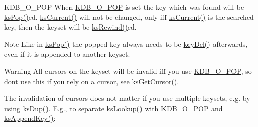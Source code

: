 \begin{DoxyParagraph}{K\+D\+B\+\_\+\+O\+\_\+\+P\+OP}
When \mbox{\hyperlink{group__keyset_gga98a3d6a4016c9dad9cbd1a99a9c2a45aa52fb5f2cc86773d393da62bebebf7984}{K\+D\+B\+\_\+\+O\+\_\+\+P\+OP}} is set the key which was found will be \mbox{\hyperlink{group__keyset_gae42530b04defb772059de0600159cf69}{ks\+Pop()}}ed. \mbox{\hyperlink{group__keyset_ga4287b9416912c5f2ab9c195cb74fb094}{ks\+Current()}} will not be changed, only iff \mbox{\hyperlink{group__keyset_ga4287b9416912c5f2ab9c195cb74fb094}{ks\+Current()}} is the searched key, then the keyset will be \mbox{\hyperlink{group__keyset_gabe793ff51f1728e3429c84a8a9086b70}{ks\+Rewind()}}ed.
\end{DoxyParagraph}
\begin{DoxyNote}{Note}
Like in \mbox{\hyperlink{group__keyset_gae42530b04defb772059de0600159cf69}{ks\+Pop()}} the popped key always needs to be \mbox{\hyperlink{group__key_ga3df95bbc2494e3e6703ece5639be5bb1}{key\+Del()}} afterwards, even if it is appended to another keyset.
\end{DoxyNote}
\begin{DoxyWarning}{Warning}
All cursors on the keyset will be invalid iff you use \mbox{\hyperlink{group__keyset_gga98a3d6a4016c9dad9cbd1a99a9c2a45aa52fb5f2cc86773d393da62bebebf7984}{K\+D\+B\+\_\+\+O\+\_\+\+P\+OP}}, so don\textquotesingle{}t use this if you rely on a cursor, see \mbox{\hyperlink{group__keyset_gaffe507ab9281c322eb16c3e992075d29}{ks\+Get\+Cursor()}}.
\end{DoxyWarning}
The invalidation of cursors does not matter if you use multiple keysets, e.\+g. by using \mbox{\hyperlink{group__keyset_gac59e4b328245463f1451f68d5106151c}{ks\+Dup()}}. E.\+g., to separate \mbox{\hyperlink{group__keyset_gaa34fc43a081e6b01e4120daa6c112004}{ks\+Lookup()}} with \mbox{\hyperlink{group__keyset_gga98a3d6a4016c9dad9cbd1a99a9c2a45aa52fb5f2cc86773d393da62bebebf7984}{K\+D\+B\+\_\+\+O\+\_\+\+P\+OP}} and \mbox{\hyperlink{group__keyset_gaa5a1d467a4d71041edce68ea7748ce45}{ks\+Append\+Key()}}\+:



